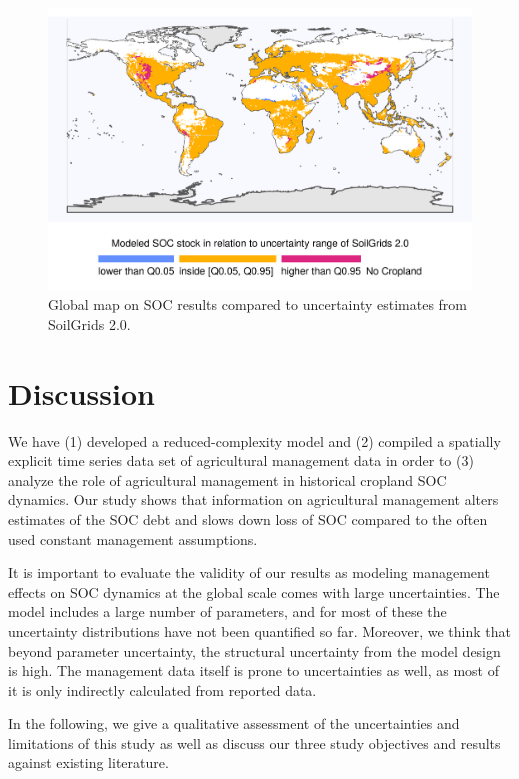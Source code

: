 \documentclass[gc, manuscript]{copernicus}
\begin{document}
\begin{figure}[h]
\includegraphics[width=14cm]{../ResultNotebooks/Output/Images/SOCquantilesSoilGrids2} \caption{Global map on SOC results compared to uncertainty estimates from SoilGrids 2.0.}\label{fig:SOCSoilGrids2Q}
\end{figure}
\newpage

\hypertarget{discussion}{%
\section{Discussion}\label{discussion}}

We have (1) developed a reduced-complexity model and (2) compiled a spatially explicit time series data set of agricultural management data in order to (3) analyze the role of agricultural management in historical cropland SOC dynamics. Our study shows that information on agricultural management alters estimates of the SOC debt and slows down loss of SOC compared to the often used constant management assumptions.

It is important to evaluate the validity of our results as modeling management effects on SOC dynamics at the global scale comes with large uncertainties. The model includes a large number of parameters, and for most of these the uncertainty distributions have not been quantified so far. Moreover, we think that beyond parameter uncertainty, the structural uncertainty from the model design is high. The management data itself is prone to uncertainties as well, as most of it is only indirectly calculated from reported data.

In the following, we give a qualitative assessment of the uncertainties and limitations of this study as well as discuss our three study objectives and results against existing literature.
\end{document}
